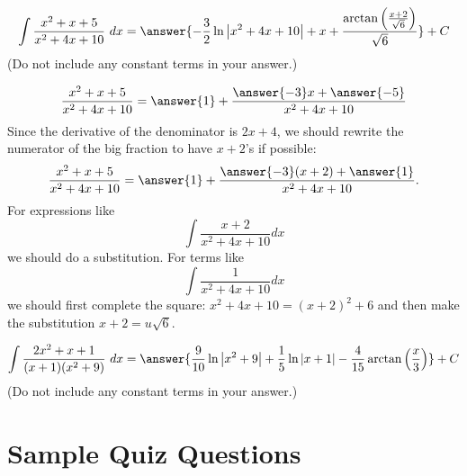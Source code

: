 \documentclass{ximera}
\begin{document}
\begin{exercise}%
\[ \int \frac{x^2+x+5}{x^2+4x+10}\ dx = \answer{-\frac{3}{2} \ln \left|x^2+4 x+10\right|+x+\frac{\arctan \left(\frac{x+2}{\sqrt{6}}\right)}{\sqrt{6}}}+C \]
(Do not include any constant terms in your answer.)
\begin{hint}
\[ \frac{x^2+x+5}{x^2+4x+10} = \answer{1} + \frac{\answer{-3} x + \answer{-5}}{x^{2} + 4 x + 10}  \]
Since the derivative of the denominator is $2x + 4$, we should rewrite the numerator of the big fraction to have $x+2$'s if possible:
\[  \frac{x^2+x+5}{x^2+4x+10} = \answer{1} + \frac{\answer{-3}(x+2) + \answer{1}}{x^2 + 4x + 10}. \]
For expressions like
\[ \int \frac{x+2}{x^2 +4x+10} dx \]
we should do a substitution. For terms like
\[ \int \frac{1}{x^2 + 4x + 10} dx \]
we should first complete the square: $x^2 + 4x + 10 =  (x + 2)^2 + 6$ and then make the substitution $x + 2 = u \sqrt{6}$.
\end{hint}
%
%
\end{exercise}

\begin{exercise}%
\[ \int \frac{2x^2+x+1}{(x+1)(x^2+9)}\ dx = \answer{\frac{9}{10} \ln \left|x^2+9\right|+\frac{1}{5} \ln |x+1|-\frac{4}{15} \arctan \left(\frac{x}{3}\right)} +C\]
(Do not include any constant terms in your answer.)
%
%
\end{exercise}

\section*{Sample Quiz Questions}
\end{document}
